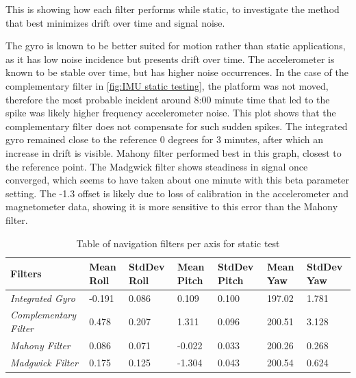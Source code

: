 This is showing how each filter performs while static, to investigate the method that best minimizes drift over time and signal noise. 

The gyro is known to be better suited for motion rather than static applications, as it has low noise incidence but presents drift over time. 
The accelerometer is known to be stable over time, but has higher noise occurrences. In the case of the complementary filter in \ref{fig:IMU static testing}, the platform was not moved, therefore the most probable incident around 8:00 minute time that led to the spike was likely higher frequency accelerometer noise. This plot shows that the complementary filter does not compensate for such sudden spikes. The integrated gyro remained close to the reference 0 degrees for 3 minutes, after which an increase in drift is visible. Mahony filter performed best in this graph, closest to the reference point. The Madgwick filter shows steadiness in signal once converged, which seems to have taken about one minute with this beta parameter setting. The -1.3 offset is likely due to loss of calibration in the accelerometer and magnetometer data, showing it is more sensitive to this error than the Mahony filter. 

\begin{table}[H]
\centering
\begin{tabular}{ | m{7em} | m{1.5cm}|m{1.5cm}|m{1.5cm}|m{1.65cm}|m{1.5cm}|m{1.7cm}| } 
\hline
\textbf{Filters} & \textbf{Mean Roll }& \textbf{StdDev  Roll} & \textbf{Mean Pitch} &\textbf{ StdDev Pitch} & \textbf{Mean Yaw} & \textbf{ StdDev Yaw}  \\
\hline
\textit{Integrated Gyro} & -0.191 & 0.086 & 0.109 & 0.100& 197.02& 1.781 \\
\hline
\textit{Complementary Filter} & 0.478 &0.207 & 1.311 & 0.096&200.51 & 3.128 \\ 
\hline
\textit{Mahony Filter} & 0.086 &0.071 & -0.022 &0.033 &200.26 & 0.268 \\ 
\hline
\textit{Madgwick Filter} & 0.175 & 0.125 & -1.304 & 0.043 & 200.54 & 0.624\\
\hline
\end{tabular}
\caption{Table of navigation filters per axis for static test}
\label{table:1}
\end{table}

